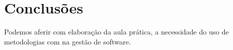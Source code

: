 






\section{Conclusões}

\par Podemos aferir com elaboração da aula prática, a necessidade do uso de metodologias com na gestão de software.



